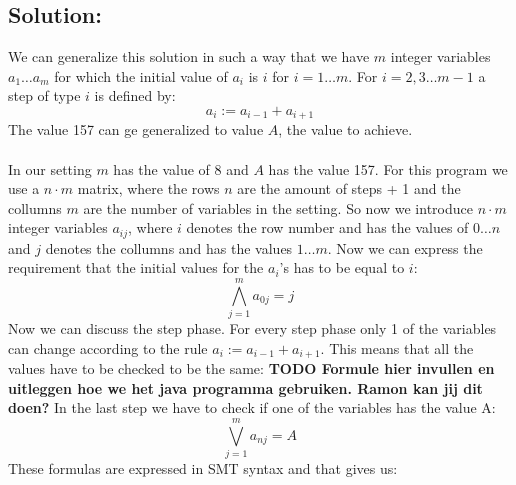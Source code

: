 \documentclass[12pt]{article}
\begin{document}
\subsection*{Solution:}
We can generalize this solution in such a way that we have $m$ integer variables $a_1 \ldots a_m$ for which the initial value of $a_i$ is $i$ for $i = 1 \ldots m$. For $i = 2,3 \ldots m-1$ a step of type $i$ is defined by:
\[a_i := a_{i-1} + a_{i+1} \]
The value 157 can ge generalized to value $A$, the value to achieve. \\
\\
\indent In our setting $m$ has the value of 8 and $A$ has the value 157. For this program we use a $n \cdot m$ matrix, where the rows $n$ are the amount of steps + 1 and the collumns $m$ are the number of variables in the setting. So now we introduce $n \cdot m$ integer variables $a_{ij}$, where $i$ denotes the row number and has the values of $0\ldots n$ and $j$ denotes the collumns and has the values $1\ldots m$.  Now we can express the requirement that the initial values for the $a_i$'s has to be equal to $i$:
\[\bigwedge_{j=1}^{m} a_{0j} = j \]
Now we can discuss the step phase. For every step phase only 1 of the variables can change according to the rule $a_i := a_{i-1} + a_{i+1}$. This means that all the values have to be checked to be the same:
\textbf{TODO Formule hier invullen en uitleggen hoe we het java programma gebruiken. Ramon kan jij dit doen?}
In the last step we have to check if one of the variables has the value A:
\[\bigvee_{j=1}^{m} a_{nj} = A \]
\noindent These formulas are expressed in SMT syntax and that gives us:
\end{document}
